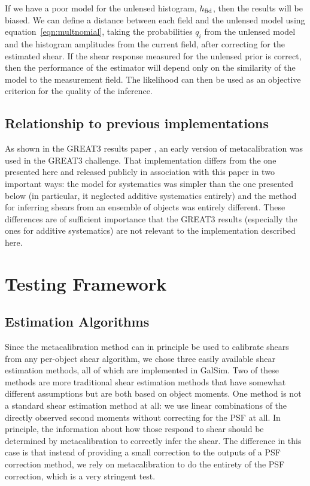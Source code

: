 \documentclass[iop]{emulateapj}
\begin{document}
If we have a poor model for the unlensed histogram, $h_{\rm fid}$,
then the results will be biased. We can define a distance between each
field and the unlensed model using equation~\ref{eqn:multnomial},
taking the probabilities $q_i$ from the unlensed model and the
histogram amplitudes from the current field, after correcting for the
estimated shear. If the shear response measured for the unlensed prior
is correct, then the performance of the estimator will depend only on
the similarity of the model to the measurement field. The likelihood
can then be used as an objective criterion for the quality of the
inference.

\subsection{Relationship to previous implementations}

As shown in the GREAT3 results paper \citep{2015MNRAS.450.2963M}, an
early version of metacalibration was used in the GREAT3 challenge.
That implementation differs from the one presented here and released
publicly in association with this paper in two important ways: the
model for systematics was simpler than the one presented below (in
particular, it neglected additive systematics entirely) and the method
for inferring shears from an ensemble of objects was entirely
different.  These differences are of sufficient importance that the
GREAT3 results (especially the ones for additive systematics) are not
relevant to the implementation described here.


\section{Testing Framework}
\label{sec:testing}

\subsection{Estimation Algorithms}

Since the metacalibration method can in principle be used to calibrate
shears from any per-object shear algorithm, we chose three easily
available shear estimation methods, all of which are implemented in
GalSim.  Two of these methods are more traditional shear estimation
methods that have somewhat different assumptions but are both based on
object moments.  One method is not a standard shear estimation method
at all: we use linear combinations of the directly observed second
moments without correcting for the PSF at all.  In principle, the
information about how those respond to shear should be determined by
metacalibration to correctly infer the shear.  The difference in this
case is that instead of providing a small correction to the outputs of
a PSF correction method, we rely on metacalibration to do the entirety
of the PSF correction, which is a very stringent test.
\end{document}
